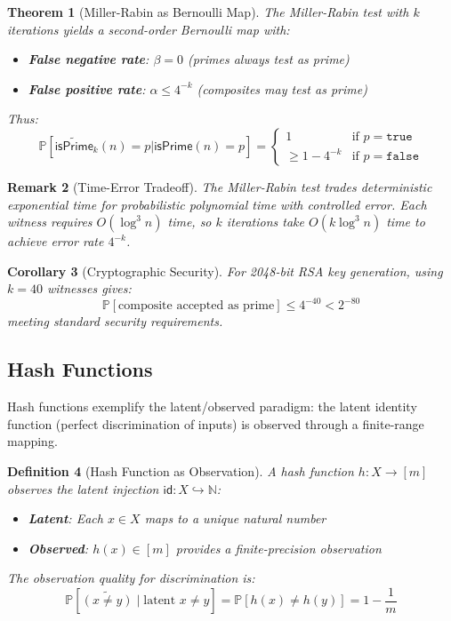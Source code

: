 \documentclass[11pt,final,hidelinks]{article}
\newtheorem{theorem}{Theorem}[section]
\newtheorem{corollary}[theorem]{Corollary}
\newtheorem{definition}[theorem]{Definition}
\newtheorem{remark}[theorem]{Remark}
\newcommand{\obs}[1]{\widetilde{#1}}  %
\newcommand{\Prob}[1]{\mathbb{P}\left[#1\right]}
\newcommand{\ProbCond}[2]{\mathbb{P}\left[#1 \mid #2\right]}
\newcommand{\True}{\mathtt{true}}
\newcommand{\False}{\mathtt{false}}
\begin{document}
\begin{theorem}[Miller-Rabin as Bernoulli Map]
The Miller-Rabin test with $k$ iterations yields a second-order Bernoulli map with:
\begin{itemize}
    \item \textbf{False negative rate}: $\beta = 0$ (primes always test as prime)
    \item \textbf{False positive rate}: $\alpha \leq 4^{-k}$ (composites may test as prime)
\end{itemize}
Thus:
\begin{equation}
\Prob{\obs{\mathsf{isPrime}}_k(n) = p | \mathsf{isPrime}(n) = p} = \begin{cases}
1 & \text{if } p = \True \\
\geq 1 - 4^{-k} & \text{if } p = \False
\end{cases}
\end{equation}
\end{theorem}

\begin{remark}[Time-Error Tradeoff]
The Miller-Rabin test trades deterministic exponential time for probabilistic polynomial time with controlled error. Each witness requires $O(\log^3 n)$ time, so $k$ iterations take $O(k \log^3 n)$ time to achieve error rate $4^{-k}$.
\end{remark}

\begin{corollary}[Cryptographic Security]
For 2048-bit RSA key generation, using $k = 40$ witnesses gives:
\begin{equation}
\Prob{\text{composite accepted as prime}} \leq 4^{-40} < 2^{-80}
\end{equation}
meeting standard security requirements.
\end{corollary}

\subsection{Hash Functions}

Hash functions exemplify the latent/observed paradigm: the latent identity function (perfect discrimination of inputs) is observed through a finite-range mapping.

\begin{definition}[Hash Function as Observation]
A hash function $h : X \to [m]$ observes the latent injection $\mathsf{id} : X \hookrightarrow \mathbb{N}$:
\begin{itemize}
    \item \textbf{Latent}: Each $x \in X$ maps to a unique natural number
    \item \textbf{Observed}: $h(x) \in [m]$ provides a finite-precision observation
\end{itemize}
The observation quality for discrimination is:
\begin{equation}
\ProbCond{\obs{(x \neq y)}}{\text{latent } x \neq y} = \Prob{h(x) \neq h(y)} = 1 - \frac{1}{m}
\end{equation}
\end{definition}
\end{document}
